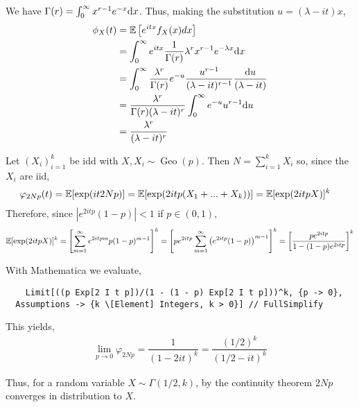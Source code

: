 \begin{solution}[Solution]
We have \( \Gamma(r) = \int_{0}^{\infty} x^{r-1}e^{-x}\mathrm{d} x \). Thus, making the substitution \( u=(\lambda-it)x \),
\begin{align*}
    \phi_X(t) &= \mathbb{E}\left[ e^{itx}f_X(x)dx \right] \\ 
    &= \int_{0}^{\infty} e^{itx} \dfrac{1}{\Gamma(r)}\lambda^r x^{r-1}e^{-\lambda x} \mathrm{d} x \\
    &= \int_{0}^{\infty} \dfrac{\lambda^r}{\Gamma(r)}e^{-u} \dfrac{u^{r-1}}{(\lambda-it)^{r-1}} \dfrac{\mathrm{d} u}{(\lambda-it)} \\
    &= \dfrac{\lambda^r}{\Gamma(r)(\lambda-it)^r}\int_{0}^{\infty} e^{-u}u^{r-1} \mathrm{d} u \\
    &= \dfrac{\lambda^r}{(\lambda-it)^r}
\end{align*}


Let \( (X_i)_{i=1}^{k} \) be idd  with \( X,X_i\sim \operatorname{Geo}(p) \).
Then \( N=\sum_{i=1}^{k} X_i \) so, since the \( X_i \) are iid,
\begin{align*}
    \varphi_{2Np}(t) &= \mathbb{E}[\exp(it2Np)] 
    =\mathbb{E}[\exp(2itp(X_1+...+X_k))] 
    =\mathbb{E}[\exp(2itpX)]^k 
\end{align*}
Therefore, since \( |e^{2itp}(1-p)|<1 \) if \( p\in(0,1) \),
\begin{align*}
    \mathbb{E}[\exp(2itpX)]^k 
    = \left[ \sum_{m=1}^{\infty} e^{2itpm}p(1-p)^{m-1} \right]^k 
    = \left[ pe^{2itp}\sum_{m=1}^{\infty}\left(e^{2itp}(1-p)\right)^{m-1} \right]^k 
    = \left[ \dfrac{pe^{2itp}}{1-(1-p)e^{2itp}} \right]^k
\end{align*}

With Mathematica we evaluate,
\begin{lstlisting}
    Limit[((p Exp[2 I t p])/(1 - (1 - p) Exp[2 I t p]))^k, {p -> 0}, 
  Assumptions -> {k \[Element] Integers, k > 0}] // FullSimplify
\end{lstlisting}

This yields,
\begin{align*}
    \lim_{p\to 0} \varphi_{2Np} = \dfrac{1}{(1-2it)^k} = \dfrac{(1/2)^k}{(1/2-it)^k}
\end{align*}

Thus, for a random variable \( X\sim\Gamma(1/2,k) \), by the continuity theorem \( 2Np \) converges in distribution to \( X \).

\end{solution}

